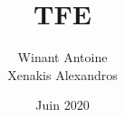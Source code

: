 \documentclass{article}
\title{TFE}
\author{Winant Antoine \\ Xenakis Alexandros }
\date{Juin 2020}
\begin{document}
\maketitle

\newpage
\renewcommand{\contentsname}{Table of contents} 
\tableofcontents


\newcommand{\notreVocabulaire}[1]{\textit{``#1"}}







\end{document}
